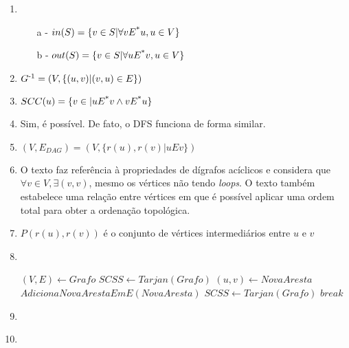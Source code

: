 \documentclass[11pt]{article}
\begin{document}
\begin{enumerate}
    \item  \hfill \\
        \begin{enumerate}
            \item[a] - $in(S) = \{v \in S | \forall vE\textsuperscript{*} u, u \in V \}$
            \item[b] - $out(S) = \{v \in S | \forall uE\textsuperscript{*} v, u \in V \}$
        \end{enumerate}
    \item $G\textsuperscript{-1} = (V, \{(u,v) | (v,u) \in E\})$
    \item $SCC(u) = \{v \in | uE\textsuperscript{*}v \land vE\textsuperscript{*}u\}$
    \item Sim, é possível. De fato, o DFS funciona de forma similar.
    \item $(V, E_{DAG}) = (V, \{r(u),r(v)|uEv\})$
    \item O texto faz referência à propriedades de dígrafos acíclicos e considera que $\forall v \in V, \exists (v,v)$, mesmo os vértices não tendo \textit{loops}. O texto também estabelece uma relação entre vértices em que é possível aplicar uma ordem total para obter a ordenação topológica.
    \item $P(r(u),r(v))$ é o conjunto de vértices intermediários entre $u$ e $v$
    \item \hfill \\
        \begin{algorithmic}
                \State $(V,E)\gets Grafo$
                \State $SCSS\gets Tarjan(Grafo)$
                \State $(u,v) \gets NovaAresta$
                \State $AdicionaNovaArestaEmE(NovaAresta)$
                            \State $SCSS\gets Tarjan(Grafo)$
                            \State $break$
                        \EndIf
                    \EndFor
                \EndFor
            \EndFunction
        \end{algorithmic}
    \item \hfill \\
        \EndFunction
    \item
\end{enumerate}
\end{document}

